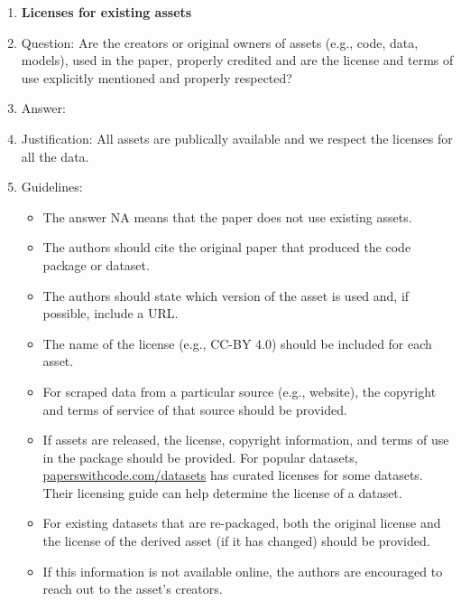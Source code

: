 \documentclass{article} %
\begin{document}
{\begin{appendices}
\begin{enumerate}
\item {\bf Licenses for existing assets}
    \item[] Question: Are the creators or original owners of assets (e.g., code, data, models), used in the paper, properly credited and are the license and terms of use explicitly mentioned and properly respected?
    \item[] Answer: \answerYes{} %
    \item[] Justification: All assets are publically available and we respect the licenses for all the data.
    \item[] Guidelines:
    \begin{itemize}
        \item The answer NA means that the paper does not use existing assets.
        \item The authors should cite the original paper that produced the code package or dataset.
        \item The authors should state which version of the asset is used and, if possible, include a URL.
        \item The name of the license (e.g., CC-BY 4.0) should be included for each asset.
        \item For scraped data from a particular source (e.g., website), the copyright and terms of service of that source should be provided.
        \item If assets are released, the license, copyright information, and terms of use in the package should be provided. For popular datasets, \url{paperswithcode.com/datasets} has curated licenses for some datasets. Their licensing guide can help determine the license of a dataset.
        \item For existing datasets that are re-packaged, both the original license and the license of the derived asset (if it has changed) should be provided.
        \item If this information is not available online, the authors are encouraged to reach out to the asset's creators.
    \end{itemize}


\end{enumerate}
\end{appendices}}
\end{document}
